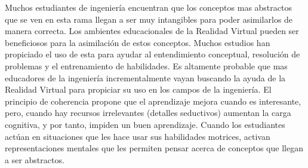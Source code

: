 Muchos estudiantes de ingeniería encuentran que los conceptos mas abstractos que se ven en esta rama llegan a ser muy intangibles para poder asimilarlos de manera correcta. Los ambientes educacionales de la Realidad Virtual pueden ser beneficiosos para la asimilación de estos conceptos. Muchos estudios han propiciado el uso de esta para ayudar al entendimiento conceptual, resolución de problemas y el entrenamiento de habilidades. Es altamente probable que mas educadores de la ingeniería incrementalmente vayan buscando la ayuda de la Realidad Virtual para propiciar su uso en los campos de la ingeniería. El principio de coherencia propone que el aprendizaje mejora cuando es interesante, pero, cuando hay recursos irrelevantes (detalles seductivos) aumentan la carga cognitiva, y por tanto, impiden un buen aprendizaje. Cuando los estudiantes actúan  en situaciones que les hace usar sus habilidades motrices, activan representaciones mentales que les permiten pensar acerca de conceptos que llegan a ser abstractos.\cite{OJE2023100033}
